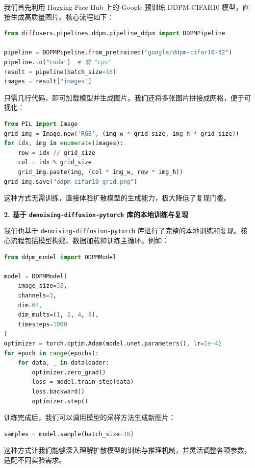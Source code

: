 \documentclass{ctexart}
\begin{document}
\noindent
我们首先利用 Hugging Face Hub 上的 Google 预训练 DDPM-CIFAR10 模型，直接生成高质量图片。核心流程如下：

\begin{lstlisting}[language=python]
from diffusers.pipelines.ddpm.pipeline_ddpm import DDPMPipeline

pipeline = DDPMPipeline.from_pretrained("google/ddpm-cifar10-32")
pipeline.to("cuda")  # 或 "cpu"
result = pipeline(batch_size=16)
images = result["images"]
\end{lstlisting}

\noindent
只需几行代码，即可加载模型并生成图片。我们还将多张图片拼接成网格，便于可视化：

\begin{lstlisting}[language=python]
from PIL import Image
grid_img = Image.new('RGB', (img_w * grid_size, img_h * grid_size))
for idx, img in enumerate(images):
    row = idx // grid_size
    col = idx % grid_size
    grid_img.paste(img, (col * img_w, row * img_h))
grid_img.save("ddpm_cifar10_grid.png")
\end{lstlisting}

\noindent
这种方式无需训练，直接体验扩散模型的生成能力，极大降低了复现门槛。

\vspace{0.5em}
\noindent
\textbf{2. 基于 \texttt{denoising-diffusion-pytorch} 库的本地训练与复现}

\noindent
我们也基于 \texttt{denoising-diffusion-pytorch} 库进行了完整的本地训练和复现。核心流程包括模型构建、数据加载和训练主循环。例如：

\begin{lstlisting}[language=python]
from ddpm_model import DDPMModel

model = DDPMModel(
    image_size=32,
    channels=3,
    dim=64,
    dim_mults=(1, 2, 4, 8),
    timesteps=1000
)
optimizer = torch.optim.Adam(model.unet.parameters(), lr=1e-4)
for epoch in range(epochs):
    for data, _ in dataloader:
        optimizer.zero_grad()
        loss = model.train_step(data)
        loss.backward()
        optimizer.step()
\end{lstlisting}

\noindent
训练完成后，我们可以调用模型的采样方法生成新图片：

\begin{lstlisting}[language=python]
samples = model.sample(batch_size=16)
\end{lstlisting}
\noindent
这种方式让我们能够深入理解扩散模型的训练与推理机制，并灵活调整各项参数，适配不同实验需求。
\end{document}
